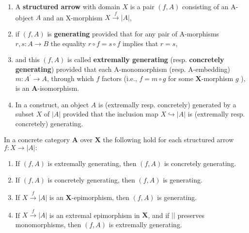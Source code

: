 \begin{enumerate}
    \item A \textbf{structured arrow} with domain $X$ is a pair $(f, A)$ consisting of an A-object $A$ and an X-morphism $X \xrightarrow{f}|A|$,
    \item if $(f, A)$ is \textbf{generating} provided that for any pair of A-morphisms $r, s: A \rightarrow B$ the equality $r \circ f=s \circ f$ implies that $r=s$,
    \item and this $(f, A)$ is called \textbf{extremally generating} (resp. \textbf{concretely generating}) provided that each A-monomorphism (resp. A-embedding) $m: A^{\prime} \rightarrow A$, through which $f$ factors (i.e., $f=m \circ g$ for some $\mathbf{X}$-morphism $g$ ), is an $\mathbf{A}$-isomorphism.
    \item In a construct, an object $A$ is (extremally resp. concretely) generated by a subset $X$ of $|A|$ provided that the inclusion map $X \hookrightarrow|A|$ is (extremally resp. concretely) generating.
\end{enumerate}

\begin{prop}
    In a concrete category $\mathbf{A}$ over $\mathbf{X}$ the following hold for each structured arrow $f: X \rightarrow|A|:$
    \begin{enumerate}
        \item If $(f, A)$ is extremally generating, then $(f, A)$ is concretely generating.
        \item If $(f, A)$ is concretely generating, then $(f, A)$ is generating.
        \item If $X \xrightarrow{f}|A|$ is an $\mathbf{X}$-epimorphism, then $(f, A)$ is generating.
        \item If $X \xrightarrow{f}|A|$ is an extremal epimorphism in $\mathbf{X}$, and if $||$ preserves monomorphisms, then $(f, A)$ is extremally generating.
    \end{enumerate}
\end{prop}

